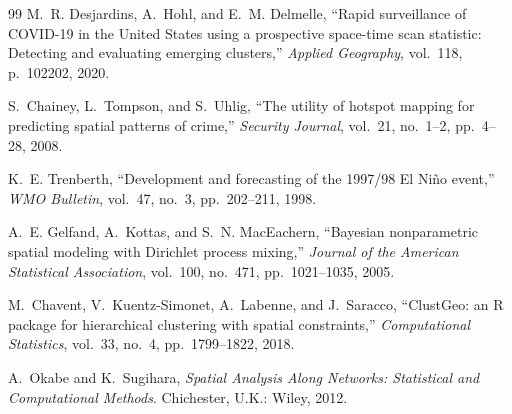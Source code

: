 \documentclass[conference]{IEEEtran}
\theoremstyle{definition}
\begin{document}
\begin{thebibliography}{99}
M.~R. Desjardins, A.~Hohl, and E.~M. Delmelle, ``Rapid surveillance of COVID-19 in the United States using a prospective space-time scan statistic: Detecting and evaluating emerging clusters,'' \emph{Applied Geography}, vol.~118, p.~102202, 2020.

S.~Chainey, L.~Tompson, and S.~Uhlig, ``The utility of hotspot mapping for predicting spatial patterns of crime,'' \emph{Security Journal}, vol.~21, no.~1--2, pp.~4--28, 2008.

K.~E. Trenberth, ``Development and forecasting of the 1997/98 El Ni\~{n}o event,'' \emph{WMO Bulletin}, vol.~47, no.~3, pp.~202--211, 1998.

A.~E. Gelfand, A.~Kottas, and S.~N. MacEachern, ``Bayesian nonparametric spatial modeling with Dirichlet process mixing,'' \emph{Journal of the American Statistical Association}, vol.~100, no.~471, pp.~1021--1035, 2005.

M.~Chavent, V.~Kuentz-Simonet, A.~Labenne, and J.~Saracco, ``ClustGeo: an R package for hierarchical clustering with spatial constraints,'' \emph{Computational Statistics}, vol.~33, no.~4, pp.~1799--1822, 2018.

A.~Okabe and K.~Sugihara, \emph{Spatial Analysis Along Networks: Statistical and Computational Methods}. Chichester, U.K.: Wiley, 2012.

\end{thebibliography}
\end{document}
